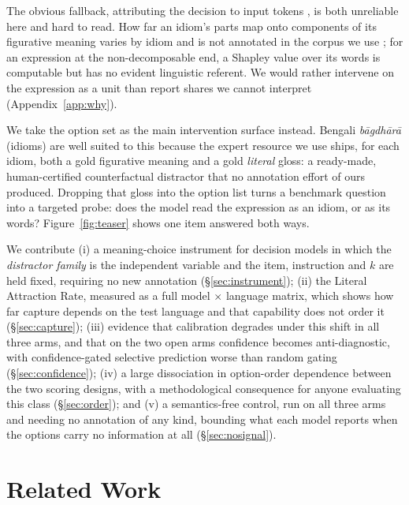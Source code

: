 \documentclass[11pt]{article}
\begin{document}
The obvious fallback, attributing the decision to input tokens
\citep{ribeiro2016lime,lundberg2017shap}, is both unreliable here
\citep{jain2019attention,adebayo2018sanity,hooker2019roar} and hard to read. How
far an idiom's parts map onto components of its figurative meaning varies by
idiom and is not annotated in the corpus we use
\citep{nunberg1994idioms,gibbs1989kick};
for an expression at the non-decomposable end, a Shapley value over its words is
computable but has no evident linguistic referent. We would rather intervene on
the expression as a unit than report shares we cannot interpret
(Appendix~\ref{app:why}).

We take the option set as the main intervention surface instead. Bengali
\emph{b\=agdh\=ar\=a} (idioms) are well suited to this because the expert
resource we use ships, for each idiom, both a gold figurative meaning and a gold
\emph{literal} gloss: a ready-made, human-certified counterfactual distractor
that no annotation effort of ours produced. Dropping that gloss into the option
list turns a benchmark question into a targeted probe: does the model read the
expression as an idiom, or as its words? Figure~\ref{fig:teaser} shows one item
answered both ways.

We contribute (i) a meaning-choice instrument for decision models in which the \emph{distractor family} is the independent variable and the item, instruction and $k$ are held fixed, requiring no new annotation (\S\ref{sec:instrument}); (ii) the Literal Attraction Rate, measured as a full model $\times$ language matrix, which shows how far capture depends on the test language and that capability does not order it (\S\ref{sec:capture}); (iii) evidence that calibration degrades under this shift in all three arms, and that on the two open arms confidence becomes anti-diagnostic, with confidence-gated selective prediction worse than random gating (\S\ref{sec:confidence}); (iv) a large dissociation in option-order dependence between the two scoring designs, with a methodological consequence for anyone evaluating this class (\S\ref{sec:order}); and (v) a semantics-free control, run on all three arms and needing no annotation of any kind, bounding what each model reports when the options carry no information at all (\S\ref{sec:nosignal}).

\section{Related Work}
\end{document}
